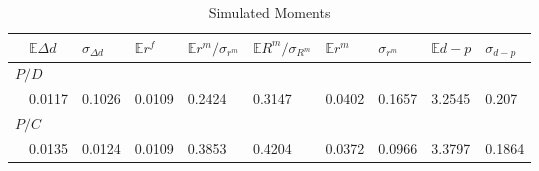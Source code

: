 \begin{table}[H]
\centering
\caption{Simulated Moments}
\label{tab:MMoomme}
\begin{tabular}{@{}llllllllll@{}}
\toprule 
 & $\mathbb{E}\Delta d$ & $\sigma_{\Delta d}$ & $\mathbb{E}r^f$ & $\mathbb{E}r^m/\sigma _{r^m}$ & $\mathbb{E}R^m/\sigma _{R^m}$ & $\mathbb{E}r^m$ & $\sigma_{r^m}$ & $\mathbb{E}d-p$ & $\sigma_{d-p}$  \\ 
\midrule 
\multicolumn{10}{l}{$P/D$}\\
 & 0.0117 & 0.1026 & 0.0109 & 0.2424 & 0.3147 & 0.0402 & 0.1657 & 3.2545 & 0.207 \\ 
\multicolumn{10}{l}{$P/C$}\\
& 0.0135 & 0.0124 & 0.0109 & 0.3853 & 0.4204 & 0.0372& 0.0966 & 3.3797 & 0.1864 \\ 
\bottomrule 
\end{tabular}
\end{table}
